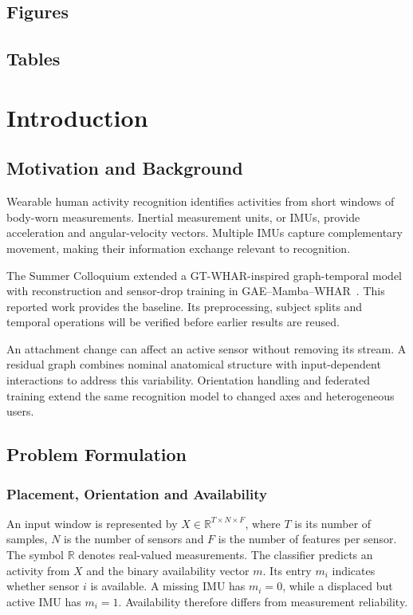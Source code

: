 \documentclass[10pt,a4paper,oneside,openany]{report}
\begin{document}
\section*{Figures}
\makeatletter
{}
\section*{Tables}
\makeatother

\cleardoublepage
{}
\chapter{Introduction}
\label{chap:introduction}

\section{Motivation and Background}

Wearable human activity recognition identifies activities from short windows of body-worn measurements. Inertial measurement units, or IMUs, provide acceleration and angular-velocity vectors. Multiple IMUs capture complementary movement, making their information exchange relevant to recognition.

The Summer Colloquium extended a GT-WHAR-inspired graph-temporal model with reconstruction and sensor-drop training in GAE--Mamba--WHAR~\cite{gtwhar,summerreport}. This reported work provides the baseline. Its preprocessing, subject splits and temporal operations will be verified before earlier results are reused.

An attachment change can affect an active sensor without removing its stream. A residual graph combines nominal anatomical structure with input-dependent interactions to address this variability. Orientation handling and federated training extend the same recognition model to changed axes and heterogeneous users.

\section{Problem Formulation}

\subsection{Placement, Orientation and Availability}

An input window is represented by $X\in\mathbb{R}^{T\times N\times F}$, where $T$ is its number of samples, $N$ is the number of sensors and $F$ is the number of features per sensor. The symbol $\mathbb{R}$ denotes real-valued measurements. The classifier predicts an activity from $X$ and the binary availability vector $m$. Its entry $m_i$ indicates whether sensor $i$ is available. A missing IMU has $m_i=0$, while a displaced but active IMU has $m_i=1$. Availability therefore differs from measurement reliability.
\end{document}
